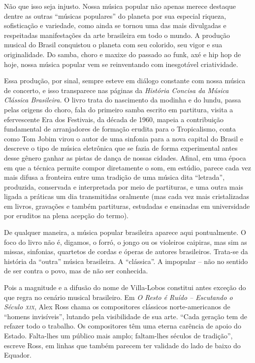 \documentclass[11pt]{extarticle}
\begin{document}

Não que isso seja injusto. Nossa música popular não apenas merece
destaque dentre as outras ``músicas populares'' do planeta por sua
especial riqueza, sofisticação e variedade, como ainda se tornou uma das
mais divulgadas e respeitadas manifestações da arte brasileira em todo o
mundo. A produção musical do Brasil conquistou o planeta com seu
colorido, seu vigor e sua originalidade. Do samba, choro e maxixe do
passado ao funk, axé e hip hop de hoje, nossa música popular vem se
reinventando com inesgotável criatividade.

Essa produção, por sinal, sempre esteve em diálogo constante com nossa
música de concerto, e isso transparece nas páginas da \emph{História
Concisa da Música Clássica Brasileira.} O livro trata do nascimento da
modinha e do lundu, passa pelas origens do choro, fala do primeiro samba
escrito em partitura, visita a efervescente Era dos Festivais, da década
de 1960, mapeia a contribuição fundamental de arranjadores de formação
erudita para o Tropicalismo, conta como Tom Jobim virou o autor de uma
sinfonia para a nova capital do Brasil e descreve o tipo de música
eletrônica que se fazia de forma experimental antes desse gênero ganhar
as pistas de dança de nossas cidades. Afinal, em uma época em que a
técnica permite compor diretamente o som, em estúdio, parece cada vez
mais difusa a fronteira entre uma tradição de uma música dita
``letrada'', produzida, conservada e interpretada por meio de
partituras, e uma outra mais ligada a práticas um dia transmitidas
oralmente (mas cada vez mais cristalizadas em livros, gravações e também
partituras, estudadas e ensinadas em universidade por eruditos na plena
acepção do termo).

De qualquer maneira, a música popular brasileira aparece aqui
pontualmente. O foco do livro não é, digamos, o forró, o jongo ou os
violeiros caipiras, mas sim as missas, sinfonias, quartetos de cordas e
óperas de autores brasileiros. Trata-se da história da ``outra'' música
brasileira. A ``clássica''. A impopular -- não no sentido de ser contra
o povo, mas de não ser conhecida.

Pois a magnitude e a difusão do nome de Villa-Lobos constitui antes
exceção do que regra no cenário musical brasileiro. Em \emph{O Resto é
Ruído -- Escutando o Século \textsc{xix}}, Alex Ross chama os compositores
clássicos norte-americanos de ``homens invisíveis'', lutando pela
visibilidade de sua arte. ``Cada geração tem de refazer todo o trabalho.
Os compositores têm uma eterna carência de apoio do Estado. Falta-lhes
um público mais amplo; faltam-lhes séculos de tradição'', escreve Ross,
em linhas que também parecem ter validade do lado de baixo do Equador.
\end{document}
